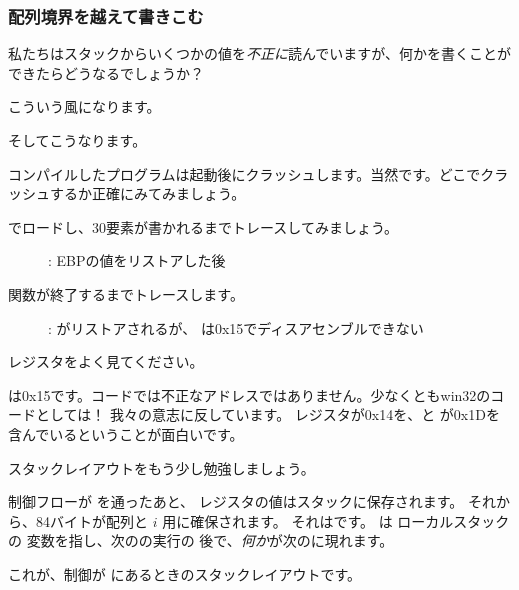 ﻿\subsubsection{配列境界を越えて書きこむ}

私たちはスタックからいくつかの値を\emph{不正に}読んでいますが、何かを書くことができたらどうなるでしょうか？

こういう風になります。




そしてこうなります。



コンパイルしたプログラムは起動後にクラッシュします。当然です。どこでクラッシュするか正確にみてみましょう。

\clearpage
\myindex{\olly}

\olly でロードし、30要素が書かれるまでトレースしてみましょう。

\begin{figure}[H]
\centering
{}
\caption{\olly: EBPの値をリストアした後}
\label{fig:array_BO_olly_w1}
\end{figure}

\clearpage
関数が終了するまでトレースします。

\begin{figure}[H]
\centering
{}
\caption{\olly: 
 がリストアされるが、 \olly は0x15でディスアセンブルできない}
\label{fig:array_BO_olly_w2}
\end{figure}

レジスタをよく見てください。

\EIP は0x15です。コードでは不正なアドレスではありません。少なくともwin32のコードとしては！
我々の意志に反しています。
\EBP レジスタが0x14を、\ECX と \EDX が0x1Dを含んでいるということが面白いです。

スタックレイアウトをもう少し勉強しましょう。

制御フローが \TT{\main} を通ったあと、 \EBP レジスタの値はスタックに保存されます。
それから、84バイトが配列と $i$ 用に確保されます。
それはです。
\ESP は ローカルスタックの  変数を指し、次のの実行の
後で、\emph{何か}が次のに現れます。

これが、制御が \main にあるときのスタックレイアウトです。

